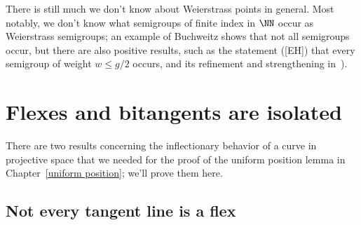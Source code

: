 %
%

There is still much we don't know about Weierstrass points in general. Most notably, we don't know what semigroups of finite index in $\NN$ occur as Weierstrass semigroups; an example of Buchweitz shows that not all semigroups occur, but there are also positive results, such as the statement ([EH]) that every semigroup of weight $w \leq g/2$ occurs, and its refinement and strengthening in~\cite{MR3892968}).


\section{Flexes and bitangents are isolated}\label{isolated flexes and bitangents}

There are two results concerning the inflectionary behavior of a curve in projective space that we needed for the proof of the uniform position lemma in Chapter~\ref{uniform position}; we'll prove them here.

\subsection{Not every tangent line is a flex}\label{isolated tangents and bitangents}

